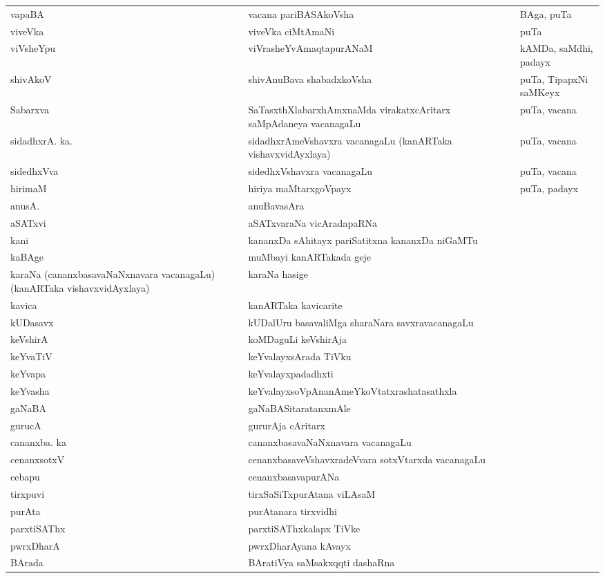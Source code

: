 {\begin{longtable}{>{\raggedright}p{3.5cm}ll}
vapaBA & vacana pariBASAkoVsha & BAga, puTa\\
viveVka & viveVka ciMtAmaNi & puTa\\
viVsheYpu & viVrasheYvAmaqtapurANaM & kAMDa, saMdhi, padayx\\
shivAkoV & shivAnuBava shabadxkoVsha & puTa, TipapxNi saMKeyx\\
Sabarxva & SaTasxthXlabarxhAmxnaMda virakatxcAritarx saMpAdaneya vacanagaLu & puTa, vacana\\
sidadhxrA. ka. & sidadhxrAmeVshavxra vacanagaLu (kanARTaka vishavxvidAyxlaya) & puTa, vacana\\
sidedhxVva & sidedhxVshavxra vacanagaLu & puTa, vacana\\
hirimaM & hiriya maMtarxgoVpayx & puTa, padayx\\
anusA. & anuBavasAra & \\
aSATxvi & aSATxvaraNa vicAradapaRNa & \\
kani & kananxDa sAhitayx pariSatitxna kananxDa niGaMTu & \\
kaBAge & muMbayi kanARTakada geje\\
karaNa (cananxbasavaNaNxnavara vacanagaLu) (kanARTaka vishavxvidAyxlaya) & karaNa hasige &\\
kavica & kanARTaka kavicarite & \\
kUDasavx & kUDalUru basavaliMga sharaNara savxravacanagaLu & \\
keVshirA & koMDaguLi keVshirAja & \\
keYvaTiV & keYvalayxsArada TiVku & \\
keYvapa & keYvalayxpadadhxti & \\
keYvasha & keYvalayxsoVpAnanAmeYkoVtatxrashatasathxla & \\
gaNaBA & gaNaBASitaratanxmAle & \\
gurucA & gururAja cAritarx & \\
cananxba. ka & cananxbasavaNaNxnavara vacanagaLu & \\
cenanxsotxV & cenanxbasaveVshavxradeVvara sotxVtarxda vacanagaLu & \\
cebapu & cenanxbasavapurANa & \\
tirxpuvi & tirxSaSiTxpurAtana viLAsaM & \\
purAta & purAtanara tirxvidhi & \\
parxtiSAThx & parxtiSAThxkalapx TiVke &\\
pwrxDharA & pwrxDharAyana kAvayx & \\
BArada & BAratiVya saMsakxqqti dashaRna & \\

\end{longtable}}
